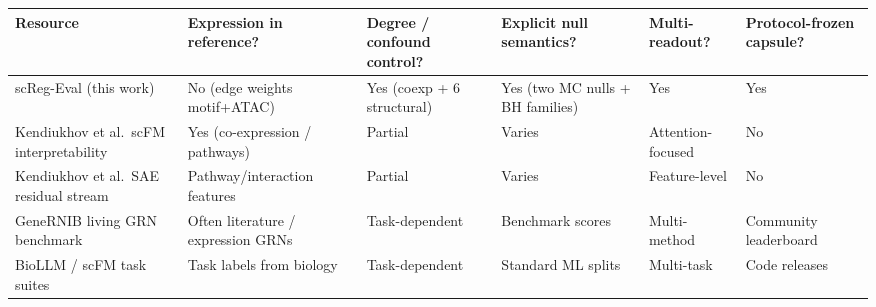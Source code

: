 {\small\setlength{\tabcolsep}{3pt}
\begin{tabularx}{\linewidth}{@{}>{\raggedright\arraybackslash}p{2.00cm}>{\centering\arraybackslash}X>{\centering\arraybackslash}X>{\centering\arraybackslash}X>{\centering\arraybackslash}X>{\centering\arraybackslash}X@{}}
\toprule
Resource & Expression in reference? & Degree / confound control? & Explicit null semantics? & Multi-readout? & Protocol-frozen capsule? \\
\midrule
scReg-Eval (this work) & No (edge weights motif+ATAC) & Yes (coexp + 6 structural) & Yes (two MC nulls + BH families) & Yes & Yes \\
Kendiukhov et al.\ scFM interpretability & Yes (co-expression / pathways) & Partial & Varies & Attention-focused & No \\
Kendiukhov et al.\ SAE residual stream & Pathway/interaction features & Partial & Varies & Feature-level & No \\
GeneRNIB living GRN benchmark & Often literature / expression GRNs & Task-dependent & Benchmark scores & Multi-method & Community leaderboard \\
BioLLM / scFM task suites & Task labels from biology & Task-dependent & Standard ML splits & Multi-task & Code releases \\
\bottomrule
\end{tabularx}
}
